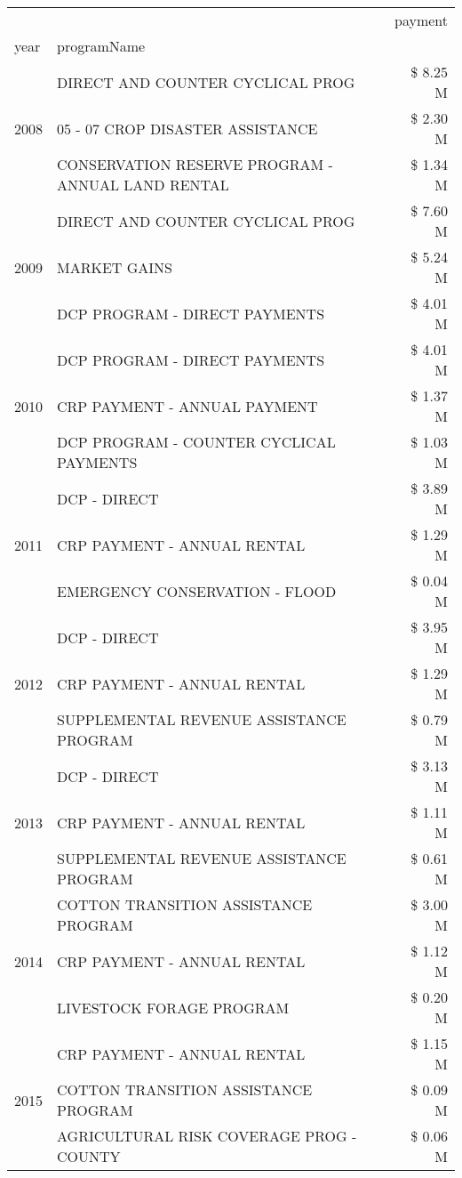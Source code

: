 \begin{tabular}{llr}
\toprule
 &  & payment \\
year & programName &  \\
\midrule
\multirow[t]{3}{*}{2008} & DIRECT AND COUNTER CYCLICAL PROG & \$ 8.25 M \\
 & 05 - 07 CROP DISASTER ASSISTANCE & \$ 2.30 M \\
 & CONSERVATION RESERVE PROGRAM - ANNUAL LAND RENTAL & \$ 1.34 M \\
\cline{1-3}
\multirow[t]{3}{*}{2009} & DIRECT AND COUNTER CYCLICAL PROG & \$ 7.60 M \\
 & MARKET GAINS & \$ 5.24 M \\
 & DCP PROGRAM - DIRECT PAYMENTS & \$ 4.01 M \\
\cline{1-3}
\multirow[t]{3}{*}{2010} & DCP PROGRAM - DIRECT PAYMENTS & \$ 4.01 M \\
 & CRP PAYMENT - ANNUAL PAYMENT & \$ 1.37 M \\
 & DCP PROGRAM - COUNTER CYCLICAL PAYMENTS & \$ 1.03 M \\
\cline{1-3}
\multirow[t]{3}{*}{2011} & DCP - DIRECT & \$ 3.89 M \\
 & CRP PAYMENT - ANNUAL RENTAL & \$ 1.29 M \\
 & EMERGENCY CONSERVATION - FLOOD & \$ 0.04 M \\
\cline{1-3}
\multirow[t]{3}{*}{2012} & DCP - DIRECT & \$ 3.95 M \\
 & CRP PAYMENT - ANNUAL RENTAL & \$ 1.29 M \\
 & SUPPLEMENTAL REVENUE ASSISTANCE PROGRAM & \$ 0.79 M \\
\cline{1-3}
\multirow[t]{3}{*}{2013} & DCP - DIRECT & \$ 3.13 M \\
 & CRP PAYMENT - ANNUAL RENTAL & \$ 1.11 M \\
 & SUPPLEMENTAL REVENUE ASSISTANCE PROGRAM & \$ 0.61 M \\
\cline{1-3}
\multirow[t]{3}{*}{2014} & COTTON TRANSITION ASSISTANCE PROGRAM & \$ 3.00 M \\
 & CRP PAYMENT - ANNUAL RENTAL & \$ 1.12 M \\
 & LIVESTOCK FORAGE PROGRAM & \$ 0.20 M \\
\cline{1-3}
\multirow[t]{3}{*}{2015} & CRP PAYMENT - ANNUAL RENTAL & \$ 1.15 M \\
 & COTTON TRANSITION ASSISTANCE PROGRAM & \$ 0.09 M \\
 & AGRICULTURAL RISK COVERAGE PROG - COUNTY & \$ 0.06 M \\
\cline{1-3}

\end{tabular}
